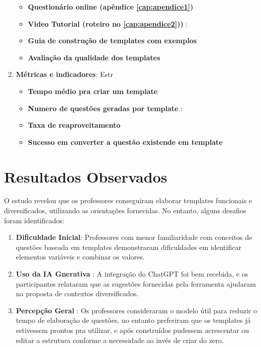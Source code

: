 \begin{enumerate}
    
    \begin{itemize}
        \item \textbf{Questionário online (apêndice \autoref{cap:apendice1})} 
        \item \textbf{Video Tutorial (roteiro no \autoref{cap:apendice2}))} :
        \item \textbf{Guia de construção de templates com exemplos} 
        \item  \textbf{Avaliação da qualidade dos templates} 
    \end{itemize}



    \item \textbf{Métricas e indicadores}:  Estr
    \begin{itemize}
        \item \textbf{Tempo médio pra criar um template} 
        \item \textbf{Numero de questões geradas por template} :
        \item \textbf{Taxa de reaproveitamento} 
        \item  \textbf{Sucesso em converter a questão existende em template} 
    \end{itemize}

    
\end{enumerate}






\section{Resultados Observados}

O estudo revelou que os professores conseguiram elaborar templates funcionais e diversificados, utilizando as orientações fornecidas. No entanto, alguns desafios foram identificados:

\begin{enumerate}
    \item \textbf{Dificuldade Inicial}: Professores com menor familiaridade com conceitos de questões baseada em templates demonstraram dificuldades em identificar elementos variáveis e combinar os valores.
    \item \textbf{Uso da IA Gnerativa} : A integração do ChatGPT foi bem recebida, e os participantes relataram que as sugestões fornecidas pela ferramenta ajudaram na proposta de contextos diversificados.
    \item \textbf{Percepção Geral} : Os professores consideraram o modelo útil para reduzir o tempo de elaboração de questões, no entanto preferiram que os templates já estivessem prontos pra utilizar, e após construídos pudessem acrescentar ou editar a estrutura conforme a necessidade ao invés de criar do zero.
\end{enumerate}


